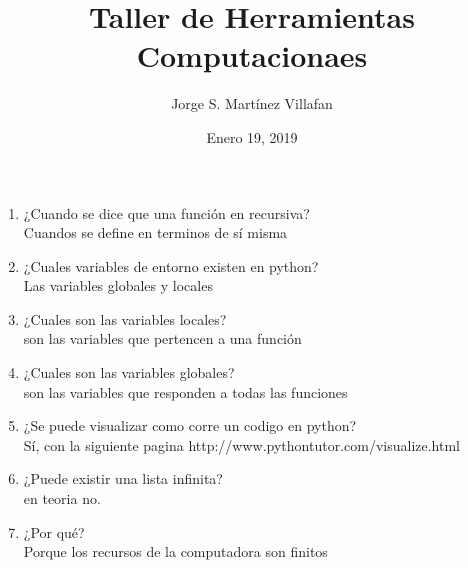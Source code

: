 \documentclass[letterpaper, 12pt, oneside]{article}%
\title{\Huge Taller de Herramientas Computacionaes}
\author{Jorge S. Martínez Villafan}
\date{Enero 19, 2019}
\begin{document}
\begin{enumerate}
\item ¿Cuando se dice que una función en recursiva?\\
\color{red} Cuandos se define en terminos de sí misma \color{black}
\item ¿Cuales variables de entorno existen en python?\\ 
\color{red} Las variables globales y locales \color{black}
\item ¿Cuales son las variables locales? \\
\color{red} son las variables que pertencen a una función \color{black}
\item ¿Cuales son las variables globales? \\
\color{red} son las variables que responden a todas las funciones \color{black}
\item ¿Se puede visualizar como corre un codigo en python?\\ 
\color{red} Sí, con la siguiente pagina  {http://www.pythontutor.com/visualize.html} \color{black}
\item ¿Puede existir una lista infinita?\\
\color{red} en teoria no.\color{black}
\item ¿Por qué?\\
\color{red} Porque los recursos de la computadora son finitos

\end{enumerate}
\end{document}
